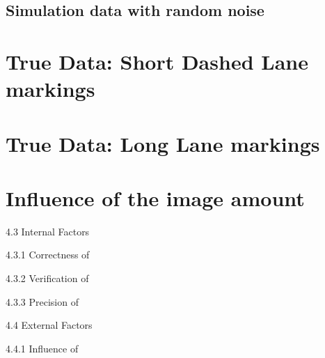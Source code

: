 \subsection{Simulation data with random noise}



\section{True Data: Short Dashed Lane markings}
\label{sec:td-short}


\section{True Data: Long Lane markings}
\label{sec:td-long}


\section{Influence of the image amount}

4.3 Internal Factors

4.3.1 Correctness of

4.3.2 Verification of

4.3.3 Precision of


4.4 External Factors

4.4.1 Influence of 

